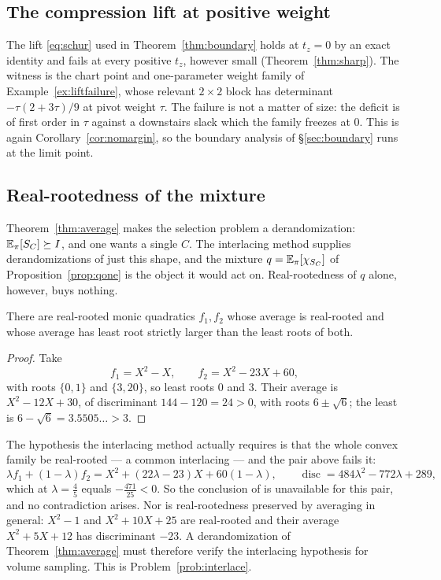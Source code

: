 \subsection{The compression lift at positive weight}\label{app:lift}

The lift \eqref{eq:schur} used in Theorem~\ref{thm:boundary} holds at $t_z=0$
by an exact identity and fails at every positive $t_z$, however small
(Theorem~\ref{thm:sharp}).  The witness is the chart point and one-parameter
weight family of Example~\ref{ex:liftfailure}, whose relevant $2\times2$ block has
determinant $-\tau(2+3\tau)/9$ at pivot weight $\tau$.  The failure is not a
matter of size: the deficit is of first order in $\tau$ against a downstairs
slack which the family freezes at $0$.  This is again
Corollary~\ref{cor:nomargin}, so the boundary analysis of
\S\ref{sec:boundary} runs at the limit point.

\subsection{Real-rootedness of the mixture}\label{app:rooted}

Theorem~\ref{thm:average} makes the selection problem a derandomization:
$\mathbb{E}_\pi[S_{C}]\succeq I$, and one wants a single $C$.  The interlacing method
supplies derandomizations of just this shape, and the mixture
$q=\mathbb{E}_\pi[\chi_{S_{C}}]$ of Proposition~\ref{prop:qone} is the object it
would act on.  Real-rootedness of $q$ alone, however, buys nothing.

\begin{proposition}\label{prop:rootedness}
There are real-rooted monic quadratics $f_1,f_2$ whose average is real-rooted
and whose average has least root strictly larger than the least roots of both.
\end{proposition}

\begin{proof}
Take
\[
  f_1=X^2-X,\qquad f_2=X^2-23X+60,
\]
with roots $\{0,1\}$ and $\{3,20\}$, so least roots $0$ and $3$.  Their average
is $X^2-12X+30$, of discriminant $144-120=24>0$, with roots $6\pm\sqrt6$; the
least is $6-\sqrt6=3.5505\ldots>3$.
\end{proof}

The hypothesis the interlacing method actually requires is that the whole
convex family be real-rooted --- a common interlacing --- and the pair above
fails it:
\[
  \lambda f_1+(1-\lambda)f_2=X^2+(22\lambda-23)X+60(1-\lambda),
  \qquad
  \operatorname{disc}=484\lambda^2-772\lambda+289 ,
\]
which at $\lambda=\tfrac45$ equals $-\tfrac{471}{25}<0$.  So the conclusion of
\cite{MSS2015} is unavailable for this pair, and no contradiction
arises.  Nor is real-rootedness
preserved by averaging in general: $X^2-1$ and $X^2+10X+25$ are real-rooted and
their average $X^2+5X+12$ has discriminant $-23$.  A derandomization of
Theorem~\ref{thm:average} must therefore verify the interlacing hypothesis for
volume sampling.  This is Problem~\ref{prob:interlace}.

